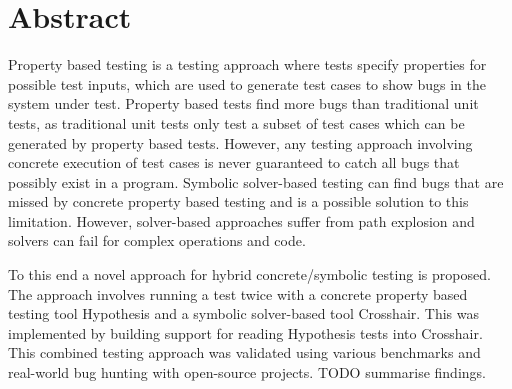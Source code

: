 \chapter*{Abstract}
\vspace{-1em}
Property based testing is a testing approach where tests specify properties for possible test inputs, which are used to generate test cases to show bugs in the system under test. Property based tests find more bugs than traditional unit tests, as traditional unit tests only test a subset of test cases which can be generated by property based tests. However, any testing approach involving concrete execution of test cases is never guaranteed to catch all bugs that possibly exist in a program. Symbolic solver-based testing can find bugs that are missed by concrete property based testing and is a possible solution to this limitation. However, solver-based approaches suffer from path explosion and solvers can fail for complex operations and code.

To this end a novel approach for hybrid concrete/symbolic testing is proposed. The approach involves running a test twice with a concrete property based testing tool Hypothesis and a symbolic solver-based tool Crosshair. This was implemented by building support for reading Hypothesis tests into Crosshair. This combined testing approach was validated using various benchmarks and real-world bug hunting with open-source projects. TODO summarise findings.


